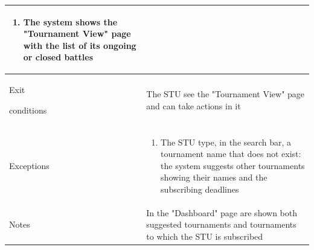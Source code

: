 \begin{center}
\begin{tabular}{| m{2cm} | m{10cm}|}
\begin{enumerate}
                                    \item The system shows the "Tournament View" page with the list of its ongoing or closed battles
                                \end{enumerate}                                                                                                                                                                 \\ \hline
        Exit \par conditions  & The STU see the "Tournament View" page and can take actions in it                                                                                                               \\ \hline
        Exceptions            & \begin{enumerate}
                                    \item The STU type, in the search bar, a tournament name that does not exist: the system suggests other tournaments showing their names and the subscribing deadlines
                                \end{enumerate}                                                                                                                                                                 \\ \hline
        Notes                 & In the "Dashboard" page are shown both suggested tournaments and tournaments to which the STU is subscribed                                                                     \\ \hline
    \end{tabular}
\end{center}


